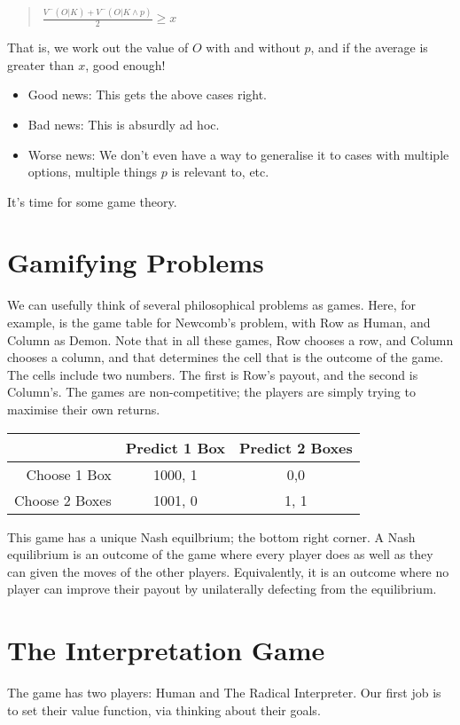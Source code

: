 \begin{quote}

$\frac{V^-(O | K) + V^-(O | K \wedge p)}{2} \geq x$
\end{quote}
That is, we work out the value of $O$ with and without $p$, and if the average is greater than $x$, good enough!

\begin{itemize}
\item Good news: This gets the above cases right.
\item Bad news: This is absurdly ad hoc.
\item Worse news: We don't even have a way to generalise it to cases with multiple options, multiple things $p$ is relevant to, etc.
\end{itemize}
It's time for some game theory.

\pagebreak
\section*{Gamifying Problems}
\label{gamifyingtheproblem}

We can usefully think of several philosophical problems as games. Here, for example, is the game table for Newcomb's problem, with Row as Human, and Column as Demon. Note that in all these games, Row chooses a row, and Column chooses a column, and that determines the cell that is the outcome of the game. The cells include two numbers. The first is Row's payout, and the second is Column's. The games are non-competitive; the players are simply trying to maximise their own returns.


\begin{center}
\begin{tabular}{r | c c}
 & Predict 1 Box & Predict 2 Boxes \\ \hline
Choose 1 Box & 1000, 1 & 0,0 \\
Choose 2 Boxes & 1001, 0 & 1, 1
\end{tabular}
\end{center}
This game has a unique Nash equilbrium; the bottom right corner. A Nash equilibrium is an outcome of the game where every player does as well as they can given the moves of the other players. Equivalently, it is an outcome where no player can improve their payout by unilaterally defecting from the equilibrium.

\section*{The Interpretation Game}
The game has two players: Human and The Radical Interpreter. Our first job is to set their value function, via thinking about their goals.

